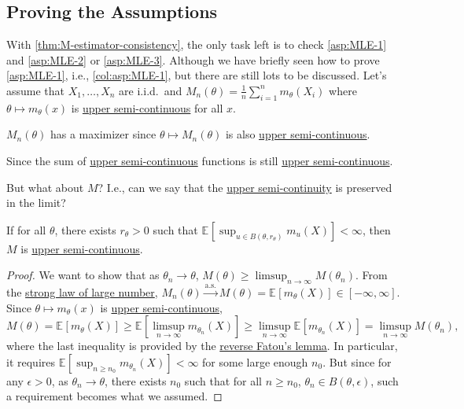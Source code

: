 \subsection{Proving the Assumptions}
With \autoref{thm:M-estimator-consistency}, the only task left is to check \autoref{asp:MLE-1} and \autoref{asp:MLE-2} or \autoref{asp:MLE-3}. Although we have briefly seen how to prove \autoref{asp:MLE-1}, i.e., \autoref{col:asp:MLE-1}, but there are still lots to be discussed. Let's assume that \(X_1, \dots , X_n\) are i.i.d.\ and \(M_n(\theta ) = \frac{1}{n}\sum_{i=1}^{n} m_\theta (X_i)\) where \(\theta \mapsto m_\theta (x)\) is \hyperref[def:upper-semi-continuous]{upper semi-continuous} for all \(x\).

\begin{note}
	\(M_n(\theta )\) has a maximizer since \(\theta \mapsto M_n(\theta )\) is also \hyperref[def:upper-semi-continuous]{upper semi-continuous}.
\end{note}
\begin{explanation}
	Since the sum of \hyperref[def:upper-semi-continuous]{upper semi-continuous} functions is still \hyperref[def:upper-semi-continuous]{upper semi-continuous}.
\end{explanation}

But what about \(M\)? I.e., can we say that the \hyperref[def:upper-semi-continuous]{upper semi-continuity} is preserved in the limit?

\begin{proposition}\label{prop:M-estimator-upper-semi-continuous}
	If for all \(\theta \), there exists \(r_\theta > 0\) such that \(\mathbb{E}_{}[\sup _{u \in B(\theta , r_\theta )} m_u(X)] < \infty \), then \(M\) is \hyperref[def:upper-semi-continuous]{upper semi-continuous}.
\end{proposition}
\begin{proof}
	We want to show that as \(\theta _n \to \theta \), \(M(\theta ) \geq \limsup_{n \to \infty} M(\theta _n)\). From the \hyperref[thm:SLLN]{strong law of large number}, \(M_n(\theta ) \overset{\text{a.s.} }{\to} M(\theta ) = \mathbb{E}_{}[m_\theta (X)] \in [-\infty , \infty ]\). Since \(\theta \mapsto m_\theta (x)\) is \hyperref[def:upper-semi-continuous]{upper semi-continuous},
	\[
		M(\theta )
		= \mathbb{E}_{}[m_\theta (X)]
		\geq \mathbb{E}_{}\left[\limsup_{n \to \infty} m_{\theta _n}(X)\right]
		\geq \limsup_{n \to \infty} \mathbb{E}_{}[m_{\theta _n}(X)]
		= \limsup_{n \to \infty} M(\theta _n),
	\]
	where the last inequality is provided by the \href{https://en.wikipedia.org/wiki/Fatou%27s_lemma#Reverse_Fatou_lemma}{reverse Fatou's lemma}. In particular, it requires \(\mathbb{E}_{}[\sup _{n \geq n_0} m_{\theta _n}(X)] < \infty \) for some large enough \(n_0\). But since for any \(\epsilon > 0\), as \(\theta _n \to \theta \), there exists \(n_0\) such that for all \(n \geq n_0\), \(\theta _n \in B(\theta , \epsilon )\), such a requirement becomes what we assumed.
\end{proof}

